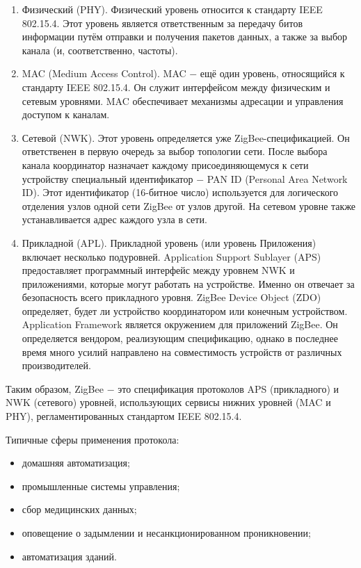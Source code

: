 	\begin{enumerate}
		\item Физический (PHY). Физический уровень относится к стандарту IEEE 802.15.4. Этот уровень
		является ответственным за передачу битов информации путём отправки и получения пакетов
		данных, а также за выбор канала (и, соответственно, частоты).
		\item MAC (Medium Access Control). MAC $-$ ещё один уровень, относящийся к стандарту IEEE 802.15.4.
		Он служит интерфейсом между физическим и сетевым уровнями. MAC обеспечивает механизмы
		адресации и управления доступом к каналам.
		\item Сетевой (NWK). Этот уровень определяется уже ZigBee-спецификацией. Он ответственен
		в первую очередь за выбор топологии сети. После выбора канала координатор назначает каждому
		присоединяющемуся к сети устройству специальный идентификатор $-$ PAN ID (Personal Area Network ID).
		Этот идентификатор (16-битное число) используется для логического отделения узлов одной сети 
		ZigBee от узлов другой. На сетевом уровне также устанавливается адрес каждого узла в сети.
		\item Прикладной (APL). Прикладной уровень (или уровень Приложения) включает несколько
		подуровней. Application Support Sublayer (APS) предоставляет программный интерфейс между 
		уровнем NWK и приложениями, которые могут работать на устройстве. Именно он отвечает за
		безопасность всего прикладного уровня. ZigBee Device Object (ZDO) определяет, будет ли устройство
		координатором или конечным устройством. Application Framework является окружением для
		приложений ZigBee. Он определяется вендором, реализующим спецификацию, однако в последнее
		время много усилий направлено на совместимость устройств от различных производителей.
	\end{enumerate}

	Таким образом, ZigBee $-$ это спецификация протоколов APS (прикладного) и NWK (сетевого) уровней,
	использующих сервисы нижних уровней (MAC и PHY), регламентированных стандартом IEEE 802.15.4. \newline
	
   Типичные сферы применения протокола:
	\begin{itemize}
		\item домашняя автоматизация;
		\item промышленные системы управления;
		\item сбор медицинских данных;
		\item оповещение о задымлении и несанкционированном проникновении;
		\item автоматизация зданий.
	\end{itemize}

